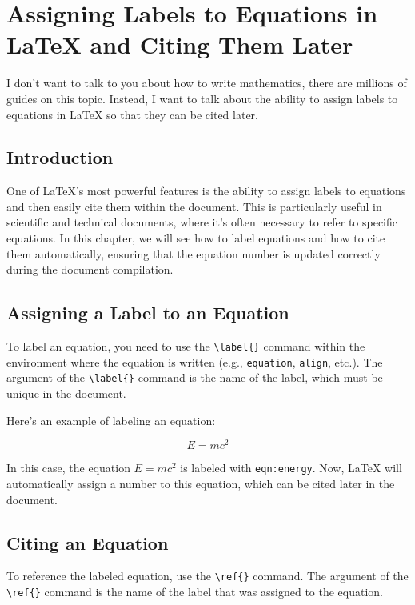 \chapter[Advanced Mathematics]{Assigning Labels to Equations in LaTeX and Citing Them Later}

I don't want to talk to you about how to write mathematics, there are millions of guides on this topic. Instead, I want to talk about the ability to assign labels to equations in LaTeX so that they can be cited later.

\section{Introduction}

One of LaTeX's most powerful features is the ability to assign labels to equations and then easily cite them within the document. This is particularly useful in scientific and technical documents, where it's often necessary to refer to specific equations. In this chapter, we will see how to label equations and how to cite them automatically, ensuring that the equation number is updated correctly during the document compilation.

\section{Assigning a Label to an Equation}

To label an equation, you need to use the \verb|\label{}| command within the environment where the equation is written (e.g., \verb|equation|, \verb|align|, etc.). The argument of the \verb|\label{}| command is the name of the label, which must be unique in the document.

Here's an example of labeling an equation:

\begin{equation}
    E = mc^2
    \label{eqn:energy}
\end{equation}

In this case, the equation \( E = mc^2 \) is labeled with \texttt{eqn:energy}. Now, LaTeX will automatically assign a number to this equation, which can be cited later in the document.

\section{Citing an Equation}

To reference the labeled equation, use the \verb|\ref{}| command. The argument of the \verb|\ref{}| command is the name of the label that was assigned to the equation.

